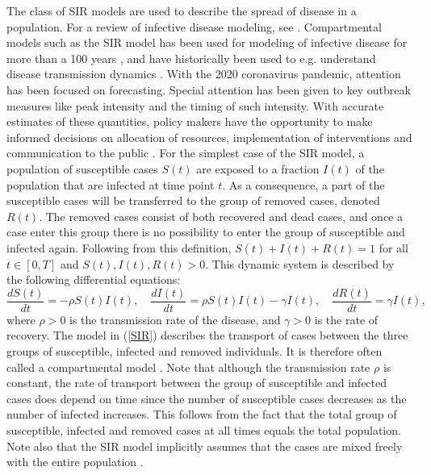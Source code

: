 \documentclass[10pt,a4paper]{article}
\begin{document}
The class of SIR models are used to describe the spread of disease in a population. For a review of infective disease modeling, see \cite{keeling2011modeling}. Compartmental models such as the SIR model has been used for modeling of infective disease for more than a 100 years \parencite{ross1911some}, and have historically been used to e.g. understand disease transmission dynamics \parencite{mills2004transmissibility}. With the 2020 coronavirus pandemic, attention has been focused on forecasting. Special attention has been given to key outbreak measures like peak intensity and the timing of such intensity. With accurate estimates of these quantities, policy makers have the opportunity to make informed decisions on allocation of resources, implementation of interventions and communication to the public \parencite{chretien2014influenza, nsoesie2013forecasting}. For the simplest case of the SIR model, a population of susceptible cases $S(t)$ are exposed to a fraction $I(t)$ of the population that are infected at time point $t$. As a consequence, a part of the susceptible cases will be transferred to the group of removed cases, denoted $R(t)$. The removed cases consist of both recovered and dead cases, and once a case enter this group there is no possibility to enter the group of susceptible and infected again. Following from this definition, $S(t) + I(t) + R(t) = 1$ for all $t \in [0,T]$ and $S(t), I(t), R(t) > 0$. This dynamic system is described by the following differential equations: 
%
\begin{equation}\label{SIR}
	\frac{dS(t)}{dt} = -\rho S(t)I(t), \quad \frac{dI(t)}{dt} = \rho S(t)I(t) - \gamma I(t), \quad \frac{dR(t)}{dt} = \gamma I(t),
\end{equation}
%
where $\rho > 0$ is the transmission rate of the disease, and $\gamma > 0$ is the rate of recovery. The model in (\ref{SIR}) describes the transport of cases between the three groups of susceptible, infected and removed individuals. It is therefore often called a compartmental model \parencite{ramsay2017dynamic}. Note that although the transmission rate $\rho$ is constant, the rate of transport between the group of susceptible and infected cases does depend on time since the number of susceptible cases decreases as the number of infected increases. This follows from the fact that the total group of susceptible, infected and removed cases at all times equals the total population. Note also that the SIR model implicitly assumes that the cases are mixed freely with the entire population \parencite{ramsay2017dynamic}.
\end{document}
